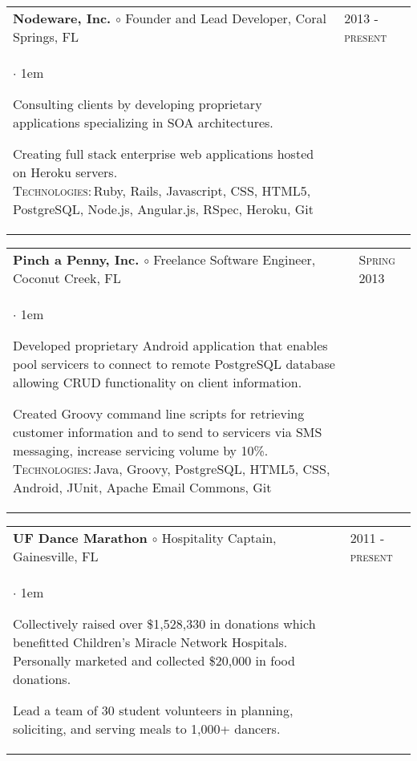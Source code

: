 \documentclass[11pt]{article}
\makeatletter
\newcommand{\employer}[4]
	{{ \begin{tabular}{l@{\hspace{5mm}}|p{30mm}}
	   \multicolumn{1}{l}{\textbf{#1 $\circ$ }#2}&\multicolumn{1}{p{30mm}}{\hspace{-3mm}\textsc{#3}} \\
	   \parbox{.825\textwidth}{#4 \vspace*{-4pt}}
	   \end{tabular} \vspace{4pt} }}
\newenvironment{achievements}           %
	{\begin{list}{$\cdot$}{\topsep 0pt \itemsep 4pt \parsep 0pt \leftmargin 1em}
	 \linespread{1.05} \selectfont %
	}
	{\end{list}\vspace*{4pt}}
\def\kt{\vspace*{2pt}\\\textsc{Technologies:\,}}
\makeatother
\begin{document}
\employer{Nodeware, Inc.}{Founder and Lead Developer, Coral Springs, FL}{2013 - present}{
\begin{achievements}

\item{Consulting clients by developing proprietary applications specializing in SOA architectures.}

\item{Creating full stack enterprise web applications hosted on Heroku servers. \kt Ruby, Rails, Javascript, CSS, HTML5, PostgreSQL, Node.js, Angular.js, RSpec, Heroku, Git}

\end{achievements} 
}


\employer{Pinch a Penny, Inc.}{Freelance Software Engineer, Coconut Creek, FL}{Spring 2013}{
	\begin{achievements}
	
	\item{Developed proprietary Android application that enables pool servicers to connect to remote PostgreSQL database allowing CRUD functionality on client information.}
	
	\item{Created Groovy command line scripts for retrieving customer information and to send to servicers via SMS messaging, increase servicing volume by 10\%.  \kt Java, Groovy, PostgreSQL, HTML5, CSS, Android, JUnit, Apache Email Commons, Git}
	
	\end{achievements}
}

\employer{UF Dance Marathon}{Hospitality Captain, Gainesville, FL}{2011 - present} {
	\begin{achievements}
	
	\item{Collectively raised over \$1,528,330 in donations which benefitted Children’s Miracle Network Hospitals. Personally marketed and collected \$20,000 in food donations.}
	\item{Lead a team of 30 student volunteers in planning, soliciting, and serving meals to 1,000+ dancers. }

	\end{achievements}
}
\end{document}

